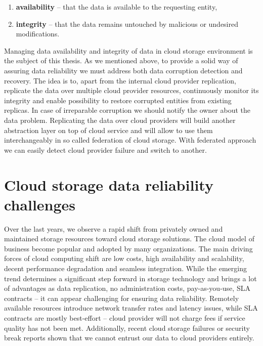 \begin{enumerate}
\item \textbf{availability} -- that the data is available to the requesting entity,
\item \textbf{integrity} -- that the data remains untouched by malicious or undesired
modifications.
\end{enumerate}

Managing data availability and integrity of data in cloud storage environment is the
subject of this thesis. As we mentioned above, to provide a solid way of assuring data
reliability we must address both data corruption detection and recovery. The idea is
to, apart from the internal cloud provider replication, replicate the data over multiple
cloud provider resources, continuously monitor its integrity and enable possibility to restore corrupted
entities from existing replicas. In case of irreparable corruption we should notify the
owner about the data problem. Replicating the data over cloud providers will build another
abstraction layer on top of cloud service and will allow to use them interchangeably in so
called federation of cloud storage. With federated approach we can easily detect cloud provider
failure and switch to another.

\section{Cloud storage data reliability challenges}

Over the last years, we observe a rapid shift from privately owned and maintained
storage resources toward cloud storage solutions. The cloud model of business become
popular and adopted by many organizations. The main driving forces of cloud computing
shift are low costs, high availability and scalability, decent performance degradation
and seamless integration. While the emerging trend determines a significant step forward 
in storage technology and brings a lot of advantages as data replication, no administration
costs, pay-as-you-use, SLA contracts -- it can appear challenging for ensuring data 
reliability. Remotely available resources introduce network transfer rates and latency issues,
while SLA contracts are mostly best-effort -- cloud provider will not charge fees if service
quality has not been met. Additionally, recent cloud storage failures or security break
reports shown that we cannot entrust our data to cloud providers entirely.\\
 
